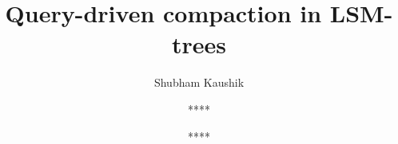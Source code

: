 \documentclass[sigconf]{acmart}
\begin{document}
\title{Query-driven compaction in LSM-trees}

\author{Shubham Kaushik}

\author{****}

\author{****}










\end{document}
